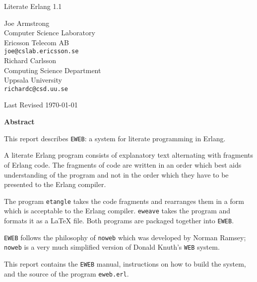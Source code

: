 

\begin{center}

\vspace{12.0cm}

{\Large Literate Erlang 1.1}

\vspace{1.5cm}

Joe Armstrong\\
Computer Science Laboratory\\
Ericsson Telecom AB\\
\verb+joe@cslab.ericsson.se+\\
\bigskip
Richard Carlsson\\
Computing Science Department\\
Uppsala University\\
\verb+richardc@csd.uu.se+

\vspace{1.5cm}
Last Revised \today
\vspace{2.5cm}

{\bf Abstract}

\end{center}

  This report describes \verb+EWEB+: a system for literate programming
in Erlang.

  A literate Erlang program consists of explanatory text alternating
with fragments of Erlang code. The fragments of code are written in an
order which best aids understanding of the program and not in the order
which they have to be presented to the Erlang compiler.

  The program \verb+etangle+ takes the code fragments and rearranges
them in a form which is acceptable to the Erlang compiler. \verb+eweave+
takes the program and formats it as a \LaTeX{} file. Both programs are
packaged together into \verb+EWEB+.

  \verb+EWEB+ follows the philosophy of \verb+noweb+ which was developed
by Norman Ramsey; \verb+noweb+ is a very much simplified version of
Donald Knuth's \verb+WEB+ system.

  This report contains the \verb+EWEB+ manual, instructions on how to
build the system, and the source of the program \verb+eweb.erl+.

\vspace{\fill}

